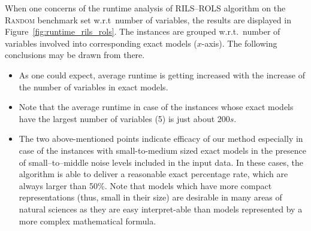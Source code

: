 \documentclass{bmcart}
\begin{document}
When one concerns of the runtime analysis of \textsc{RILS}--\textsc{ROLS} algorithm on the \textsc{Random} benchmark set w.r.t\ number of variables, the results are displayed in Figure~\ref{fig:runtime_rils_rols}. The instances are grouped w.r.t.\ number of variables involved into corresponding exact models ($x$-axis). The following conclusions may be drawn from there.  

\begin{itemize}
	\item As one could expect, average runtime is getting increased with the increase of the number of variables in exact models. 
	\item Note that the average runtime in case of the instances whose exact models have the largest number of variables (5) is just about 200$s$.
	\item The two above-mentioned points indicate efficacy of our method especially in case of the instances with small-to-medium sized exact models in the presence of small--to--middle noise levels included in the input data. In these cases, the algorithm is able to deliver a reasonable exact percentage rate, which are always larger than 50\%. Note that models which have more compact representations (thus, small in their size) are desirable in many areas of natural sciences as they are easy interpret-able than models represented by a more complex mathematical formula.   
\end{itemize}
\end{document}
